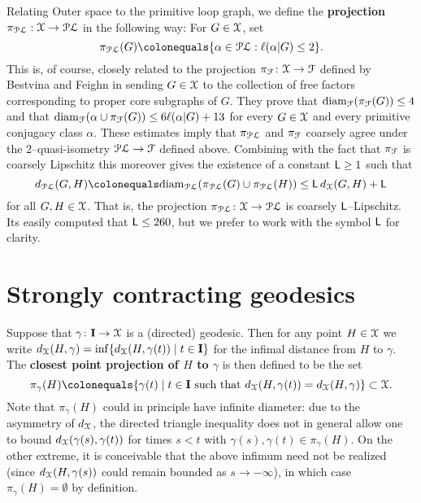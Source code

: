 \documentclass[letterpaper,fleqn]{article}
\theoremstyle{plain}
\theoremstyle{definition}
\newcommand{\define}[1]{\textbf{#1}}
\DeclareMathOperator{\diam}{diam}
\newcommand{\factor}{{\EuScript F}} %
\newcommand{\F}{\factor} %
\newcommand{\fc}{\factor} %
\newcommand{\pl}{{\EuScript{PL}}} %
\newcommand{\os}{{\EuScript X}} %
\newcommand{\X}{\os}
\newcommand{\fproj}{\pi_\fc} %
\newcommand{\plproj}{\pi_\pl} %
\newcommand{\len}{\ell}  %
\newcommand{\cp}{\pi} %
\newcommand{\lipconst}{{\sf L}} %
\renewcommand{\diam}{\mathrm{diam}}
\newcommand{\I}{\mathbf{I}}
\begin{document}
Relating Outer space to the primitive loop graph, we define the \define{projection} $\plproj: \X \to \pl$ in the following way: For $G \in \X$, set
\[\plproj(G) \colonequals \{\alpha \in \pl : \ell(\alpha|G) \le 2   \}. \]
This is, of course, closely related to the projection $\fproj\colon \X \to \F$ defined by Bestvina and Feighn in \cite{BFhyp} sending $G \in \X$ to the collection of free factors corresponding to proper core subgraphs of $G$. They prove that $\diam_\fc(\fproj(G))\le 4$ \cite[Lemma 3.1]{BFhyp} and that $ \diam_\fc(\alpha \cup \fproj(G))\le 6\len(\alpha\vert G) + 13$ \cite[Lemma 3.3]{BFhyp} for every $G\in \os$ and every primitive conjugacy class $\alpha$.
These estimates imply that $\plproj$ and $\fproj$ coarsely agree under the $2$--quasi-isometry $\pl\to\fc$ defined above. Combining with the fact that $\fproj$ is coarsely Lipschitz 
\cite[Corollary 3.5]{BFhyp}
this moreover gives the existence of a constant $\lipconst \ge 1$ such that 
\[d_\pl(G,H) \colonequals \diam_\pl(\plproj(G)\cup\plproj(H)) \le \lipconst\, d_\os(G,H) + \lipconst\]
for all $G,H\in \os$. That is, the projection $\plproj\colon \X \to \pl$ is coarsely $\lipconst$--Lipschitz. Its easily computed that $\lipconst \le 260$, but we prefer to work with the symbol $\lipconst$ for clarity.


\section{Strongly contracting geodesics} \label{sec: strong_contract}

Suppose that $\gamma\colon \I\to \os$ is a (directed) geodesic. Then for any point $H\in \os$ we write $d_\os(H,\gamma) = \inf\{d_\os(H,\gamma(t)) \mid t\in \I \}$ for the infimal distance from $H$ to $\gamma$. The \define{closest point projection of $H$ to $\gamma$} is then defined to be the set
\[ \cp_\gamma(H) \colonequals \{ \gamma(t) \mid t\in \I \text{ such that } d_\os(H,\gamma(t)) = d_\os(H,\gamma)\} \subset \os.\]
Note that $\pi_\gamma(H)$ could in principle have infinite diameter: due to the asymmetry of $d_\os$, the directed triangle inequality does not in general allow one to bound $d_\os(\gamma(s),\gamma(t))$ for times $s < t$ with $\gamma(s),\gamma(t)\in \pi_\gamma(H)$. On the other extreme, it is conceivable that the above infimum need not be realized (since $d_\os(H,\gamma(s))$ could remain bounded as $s\to -\infty$), in which case $\cp_\gamma(H)=\emptyset$ by definition. 
\end{document}
